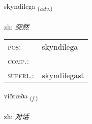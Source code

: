 \documentclass[frontgrid, backgrid]{flacards}\usepackage[]{graphicx}\usepackage[]{color}
\begin{document}
\renewcommand{\blhead}{\vskip5pt {\small\bfseries\footnotesize Atviksorð | 副词 }}
\renewcommand{\bcfoot}{\vskip5pt \hspace{2pt}{\small\bfseries\footnotesize 2K}}


{skyndilega \small{\textsubscript{(\textit{adv.})}} \\[1ex] %
\textphonetic{[scɪntɪlɛɣa]} \\
zh: \emph{突然} \\  [2ex]
\renewcommand*{\arraystretch}{0.8}
\begin{tabular}{ll}
\textsc{pos}: & skyndilega \\ 
\textsc{comp.}: &  \\ 
\textsc{superl.}: & skyndilegast \\
\end{tabular}
}

\renewcommand{\flhead}{\vskip5pt \fboxsep=0pt {\small\bfseries\footnotesize Nafnorð | 名词}}
\renewcommand{\fcfoot}{\vskip5pt \fboxsep=0pt \hspace{2pt}{\small\bfseries\footnotesize 2K}}

\renewcommand{\blhead}{\vskip5pt {\small\bfseries\footnotesize Nafnorð | 名词 }}
\renewcommand{\bcfoot}{\vskip5pt \hspace{2pt}{\small\bfseries\footnotesize 2K}}


{viðræða \small{\textsubscript{(\textit{f.})}} \\[1ex] %
\textphonetic{[vɪðraiða]} \\
zh: \emph{对话} \\  [2ex]
\renewcommand*{\arraystretch}{0.8}
}

\renewcommand{\flhead}{\vskip5pt \fboxsep=0pt {\small\bfseries\footnotesize Nafnorð | 名词}}
\renewcommand{\fcfoot}{\vskip5pt \fboxsep=0pt \hspace{2pt}{\small\bfseries\footnotesize 2K}}
\end{document}
